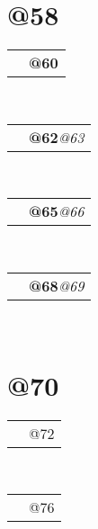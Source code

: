 \documentclass[11pt,a4paper,sans]{moderncv}
\makeatletter
\renewcommand*{\cvlanguage}[3]{%
  \cvline{#1}{\textbf{#2}\hspace*{\separatorcolumnwidth}\emph{#3}}}
\renewcommand*{\cvline}[3][.25em]{%
	  \begin{tabular}{@{}p{\hintscolumnwidth}@{\hspace{\separatorcolumnwidth}}p{\maincolumnwidth}@{}}%
          \centering\hintfont{#2} &{#3}%
	  \end{tabular}\\[#1]}
\makeatother
\begin{document}
\section{@58}
\cvlanguage{@59}{@60}{}
\cvlanguage{@61}{@62}{@63}
\cvlanguage{@64}{@65}{@66}
\cvlanguage{@67}{@68}{@69}
\SECTIONSPACE
\section{@70}
\cvline{@71}{@72 \newline{\emph{@73}} \newline{\emph{@74}}\ENTRYSPACE}
\cvline{@75}{@76 \newline{\emph{@77}} \newline{\emph{@78}}}
\end{document}
